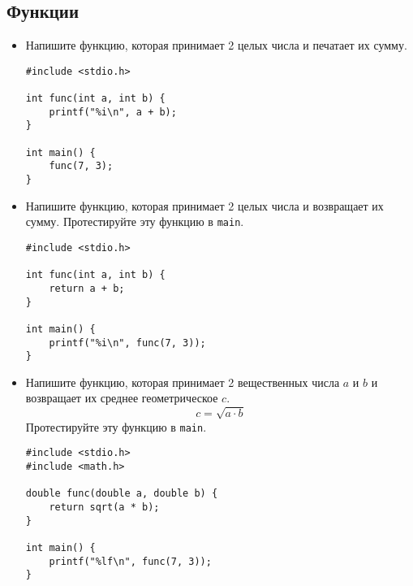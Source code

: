 \documentclass{article}
\begin{document}
\subsection*{Функции}
\begin{itemize}
\item Напишите функцию, которая принимает 2 целых числа и печатает их сумму.

\begin{lstlisting}[backgroundcolor = \color{solcolor}]
#include <stdio.h>

int func(int a, int b) {
    printf("%i\n", a + b);
}

int main() {
    func(7, 3);   
}
\end{lstlisting}


\newpage
\item Напишите функцию, которая принимает 2 целых числа и возвращает их сумму. Протестируйте эту функцию в \texttt{main}.
\begin{lstlisting}[backgroundcolor = \color{solcolor}]
#include <stdio.h>

int func(int a, int b) {
    return a + b;
}

int main() {
    printf("%i\n", func(7, 3));   
}
\end{lstlisting}
\item Напишите функцию, которая принимает 2 вещественных числа $a$ и  $b$ и возвращает их среднее геометрическое $c$.
$$
c = \sqrt{a \cdot b}
$$
Протестируйте эту функцию в \texttt{main}.

\begin{lstlisting}[backgroundcolor = \color{solcolor}]
#include <stdio.h>
#include <math.h>

double func(double a, double b) {
    return sqrt(a * b);
}

int main() {
    printf("%lf\n", func(7, 3));   
}
\end{lstlisting}
\end{itemize}
\end{document}
